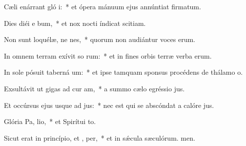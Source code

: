 \item Cæli enárrant gló i:~* et ópera mánuum ejus annúntiat firmatum.
\item Dies diéi e bum,~* et nox nocti índicat scitiam.
\item Non sunt loquélæ, ne nes,~* quorum non audiántur voces erum.
\item In omnem terram exívit so rum:~* et in fines orbis terræ verba erum.
\item In sole pósuit taberná um:~* et ipse tamquam sponsus procédens de thálamo o.
\item Exsultávit ut gigas ad cur am,~* a summo cælo egréssio jus.
\item Et occúrsus ejus usque ad  jus:~* nec est qui se abscóndat a calóre jus.
\item Glória Pa,  lio,~* et Spirítui to.
\item Sicut erat in princípio, et ,  per,~* et in sǽcula sæculórum. men.
